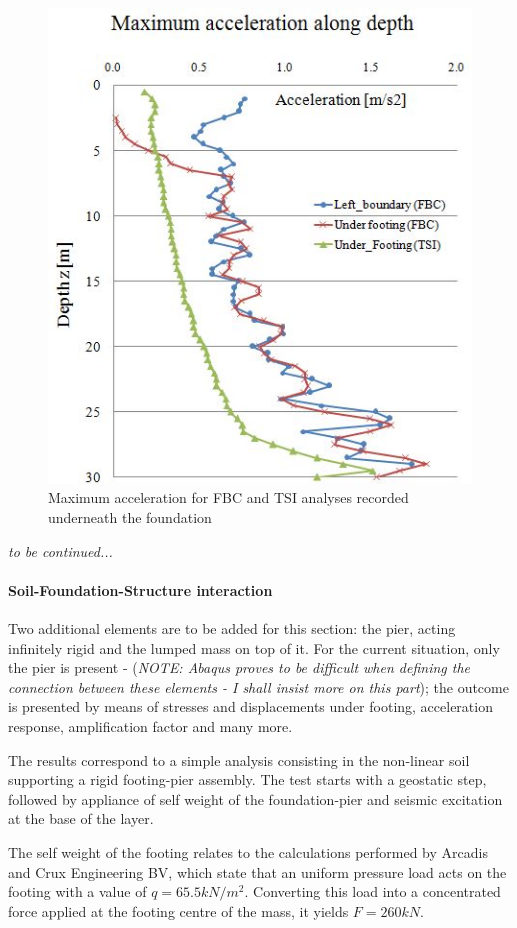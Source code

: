 	\begin{figure}[!h]
		\centering
		\includegraphics[width=0.6 \linewidth]{"max_ax"}
		\caption{Maximum acceleration for FBC and TSI analyses recorded underneath the foundation}
		\label{maxax}
	\end{figure}
	
\textit{to be continued...}	

\newpage
\paragraph{Soil-Foundation-Structure interaction}
Two additional elements are to be added for this section: the pier, acting infinitely rigid and the lumped mass on top of it. For the current situation, only the pier is present - (\textit{NOTE: Abaqus proves to be difficult when defining the connection between these elements - I shall insist more on this part}); the outcome is presented by means of stresses and displacements under footing, acceleration response, amplification factor and many more.

The results correspond to a simple analysis consisting in the non-linear soil supporting a rigid footing-pier assembly. The test starts with a geostatic step, followed by appliance of self weight of the foundation-pier and seismic excitation at the base of the layer. 

The self weight of the footing relates to the calculations performed by Arcadis and Crux Engineering BV, which state that an uniform pressure load acts on the footing with a value of $q=65.5 kN/m^2$. Converting this load into a concentrated force applied at the footing centre of the mass, it yields $F=260 kN$. 

